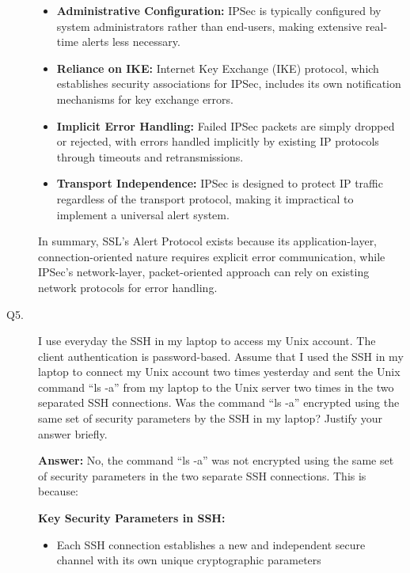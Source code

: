 \documentclass[11pt]{article}
\begin{document}
\begin{description}
\begin{itemize}
        \item \textbf{Administrative Configuration:} IPSec is typically configured by system administrators rather than end-users, making extensive real-time alerts less necessary.
        
        \item \textbf{Reliance on IKE:} Internet Key Exchange (IKE) protocol, which establishes security associations for IPSec, includes its own notification mechanisms for key exchange errors.
        
        \item \textbf{Implicit Error Handling:} Failed IPSec packets are simply dropped or rejected, with errors handled implicitly by existing IP protocols through timeouts and retransmissions.
        
        \item \textbf{Transport Independence:} IPSec is designed to protect IP traffic regardless of the transport protocol, making it impractical to implement a universal alert system.
    \end{itemize}
    
    In summary, SSL's Alert Protocol exists because its application-layer, connection-oriented nature requires explicit error communication, while IPSec's network-layer, packet-oriented approach can rely on existing network protocols for error handling.

\item[Q5.] 
I use everyday the SSH in my laptop to access my Unix account. 
The client authentication is password-based. Assume that I used the SSH 
in my laptop to connect my Unix account two times yesterday and sent the 
Unix command ``ls -a'' from my laptop to the Unix server two times in the 
two separated SSH connections. Was the command ``ls -a'' encrypted using 
the same set of security parameters by the SSH in my laptop? Justify your 
answer briefly.   \hfill {}



\textbf{Answer:}
    No, the command ``ls -a'' was not encrypted using the same set of security parameters in the two separate SSH connections. This is because:
    
    \textbf{Key Security Parameters in SSH:}
    \begin{itemize}
        \item Each SSH connection establishes a new and independent secure channel with its own unique cryptographic parameters
        

\end{itemize}
\end{description}
\end{document}
